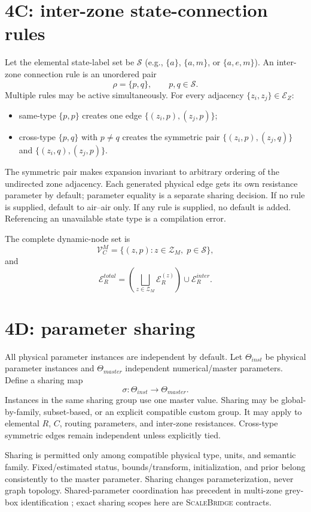 \documentclass[11pt]{article}
\newcommand{\ScaleBridge}{\textsc{ScaleBridge}}
\begin{document}
\section{4C: inter-zone state-connection rules}
Let the elemental state-label set be $\mathcal S$ (e.g., $\{a\}$, $\{a,m\}$, or $\{a,e,m\}$).  An inter-zone connection rule is an unordered pair
\[
\rho=\{p,q\},\qquad p,q\in\mathcal S.
\]
Multiple rules may be active simultaneously. For every adjacency $\{z_i,z_j\}\in\mathcal E_Z$:
\begin{itemize}[leftmargin=*]
\item same-type $\{p,p\}$ creates one edge $\{(z_i,p),(z_j,p)\}$;
\item cross-type $\{p,q\}$ with $p\ne q$ creates the symmetric pair $\{(z_i,p),(z_j,q)\}$ and $\{(z_i,q),(z_j,p)\}$.
\end{itemize}
The symmetric pair makes expansion invariant to arbitrary ordering of the undirected zone adjacency.  Each generated physical edge gets its own resistance parameter by default; parameter equality is a separate sharing decision.  If no rule is supplied, default to air--air only.  If any rule is supplied, no default is added.  Referencing an unavailable state type is a compilation error.

The complete dynamic-node set is
\[
\mathcal V_C^M=\{(z,p):z\in\mathcal Z_M,\;p\in\mathcal S\},
\]
and
\[
\mathcal E_R^{total}=\left(\bigsqcup_{z\in\mathcal Z_M}\mathcal E_R^{(z)}\right)\cup\mathcal E_R^{inter}.
\]

\section{4D: parameter sharing}
All physical parameter instances are independent by default. Let $\Theta_{inst}$ be physical parameter instances and $\Theta_{master}$ independent numerical/master parameters. Define a sharing map
\[
\sigma:\Theta_{inst}\rightarrow\Theta_{master}.
\]
Instances in the same sharing group use one master value. Sharing may be global-by-family, subset-based, or an explicit compatible custom group. It may apply to elemental $R$, $C$, routing parameters, and inter-zone resistances. Cross-type symmetric edges remain independent unless explicitly tied.

Sharing is permitted only among compatible physical type, units, and semantic family. Fixed/estimated status, bounds/transform, initialization, and prior belong consistently to the master parameter. Sharing changes parameterization, never graph topology. Shared-parameter coordination has precedent in multi-zone grey-box identification \citep{BaumeltDostal2020DistributedGreyBox}; exact sharing scopes here are \ScaleBridge{} contracts.
\end{document}
